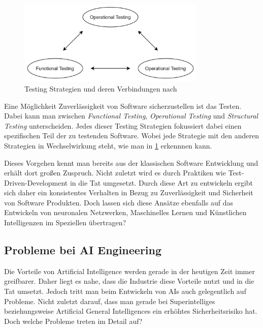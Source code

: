         \begin{figure}[h]
            \begin{center}
                \includegraphics[width=0.8\textwidth]{figures/testing.png}
                \caption[Testing Strategies]{Testing Strategien und deren Verbindungen nach \cite{bertolino2019}}
                \label{pic:testing-strategies}
            \end{center}
        \end{figure}

        Eine Möglichkeit Zuverlässigkeit von Software sicherzustellen ist das Testen. Dabei kann man zwischen
        \textit{Functional Testing}, \textit{Operational Testing} und \textit{Structural Testing} unterscheiden.
        Jedes dieser Testing Strategien fokussiert dabei einen spezifischen Teil der zu testenden Software. \cite[p. 26]{bertolino2019}
        Wobei jede Strategie mit den anderen Strategien in Wechselwirkung steht, wie man in \ref{pic:testing-strategies}
        erkennnen kann.

        Dieses Vorgehen kennt man bereits aus der klassischen Software Entwicklung und erhält dort großen Zuspruch.
        Nicht zuletzt wird es durch Praktiken wie Test-Driven-Development in die Tat umgesetzt. \cite[p. 403]{Kollanus2010}
        Durch diese Art zu entwickeln ergibt sich daher ein konsistentes Verhalten in Bezug zu Zuverlässigkeit und
        Sicherheit von Software Produkten. Doch lassen sich diese Ansätze ebenfalls auf das Entwickeln von
        neuronalen Netzwerken, Maschinelles Lernen und Künstlichen Intelligenzen im Speziellen übertragen?

        \subsection{Probleme bei AI Engineering}
        Die Vorteile von Artificial Intelligence werden gerade in der heutigen Zeit immer greifbarer. Daher liegt es
        nahe, dass die Industrie diese Vorteile nutzt und in die Tat umsetzt. Jedoch tritt man beim Entwickeln von AIs
        auch gelegentlich auf Probleme. Nicht zuletzt darauf, dass man gerade bei Superintelliges beziehungsweise
        Artificial General Intelligences ein erhöhtes Sicherheitsrisiko hat. Doch welche Probleme treten im Detail auf?

